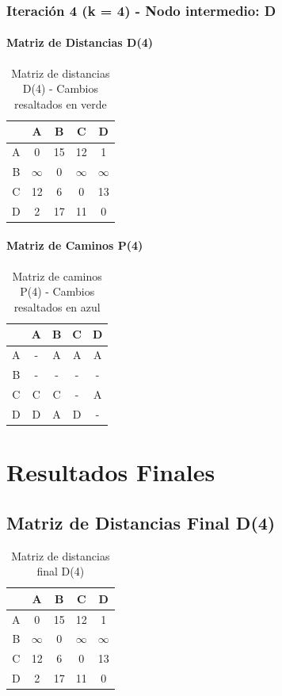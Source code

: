 \documentclass[12pt]{article}
\begin{document}
\clearpage
\subsubsection{Iteración 4 (k = 4) - Nodo intermedio: D}
\paragraph{Matriz de Distancias D(4)}
\begin{table}[h!]
\centering
\begin{tabular}{|c|c|c|c|c|}
\hline
 & A & B & C & D \\\hline
A & 0 & 15 & 12 & 1 \\\hline
B & $\infty$ & 0 & $\infty$ & $\infty$ \\\hline
C & 12 & 6 & 0 & 13 \\\hline
D & 2 & 17 & 11 & 0 \\\hline
\end{tabular}
\caption{Matriz de distancias D(4) - Cambios resaltados en verde}
\end{table}

\paragraph{Matriz de Caminos P(4)}
\begin{table}[h!]
\centering
\begin{tabular}{|c|c|c|c|c|}
\hline
 & A & B & C & D \\\hline
A & - & A & A & A \\\hline
B & - & - & - & - \\\hline
C & C & C & - & A \\\hline
D & D & A & D & - \\\hline
\end{tabular}
\caption{Matriz de caminos P(4) - Cambios resaltados en azul}
\end{table}

\clearpage
\section{Resultados Finales}
\subsection{Matriz de Distancias Final D(4)}
\begin{table}[h!]
\centering
\begin{tabular}{|c|c|c|c|c|}
\hline
 & A & B & C & D \\\hline
A & 0 & 15 & 12 & 1 \\\hline
B & $\infty$ & 0 & $\infty$ & $\infty$ \\\hline
C & 12 & 6 & 0 & 13 \\\hline
D & 2 & 17 & 11 & 0 \\\hline
\end{tabular}
\caption{Matriz de distancias final D(4)}
\end{table}
\end{document}
